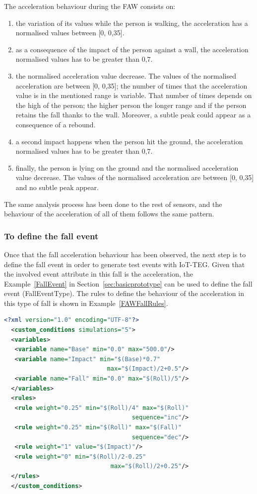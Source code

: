 \documentclass[conference]{IEEEtran}
\theoremstyle{definition}
\begin{document}
The acceleration behaviour during the FAW consists on:
\begin{enumerate}
 \item the variation of its values while the person is walking, the acceleration has a normalised values between [0, 0,35].
 \item as a consequence of the impact of the person against a wall, the acceleration normalised values has to be greater than 0,7.
 \item the normalised acceleration value decrease. The values of the normalised acceleration are between [0, 0,35]; the number of times that 
 the acceleration value is in the mentioned range is variable. That number of times depends on the high of the person; the higher person
 the longer range and if the person retains the fall thanks to the wall. Moreover, a subtle peak could appear as a consequence of a rebound.
 \item a second impact happens when the person hit the ground, the acceleration normalised values has to be greater than 0,7.
 \item finally, the person is lying on the ground and the normalised acceleration value decrease. The values of the normalised acceleration are 
 between [0, 0,35] and no subtle peak appear. 
\end{enumerate}

The same analysis process has been done to the rest of sensors, and the behaviour of the acceleration of all of them follows the same pattern.

\subsubsection*{To define the fall event} Once that the fall acceleration behaviour has been observed, the next step is to define the 
fall event in order to generate test events with IoT-TEG. Given that the involved event attribute in this fall is the acceleration, 
the Example~\ref{FallEvent} in Section~\ref{sec:basicprototype} can be used to define the fall event (FallEventType). The rules to
define the behaviour of the acceleration in this type of fall is shown in Example~\ref{FAWFallRules}.

\begin{lstlisting}[basicstyle=\ttfamily\footnotesize,language=XML,caption={Rules to define a FAW fall},label=FAWFallRules]
  <?xml version="1.0" encoding="UTF-8"?>
  <custom_conditions simulations="5">
  <variables>
   <variable name="Base" min="0.0" max="500.0"/>
   <variable name="Impact" min="$(Base)*0.7" 
                             max="$(Impact)/2+0.5"/>
   <variable name="Fall" min="0.0" max="$(Roll)/5"/>
  </variables>
  <rules>
   <rule weight="0.25" min="$(Roll)/4" max="$(Roll)" 
                                    sequence="inc"/>
   <rule weight="0.25" min="$(Roll)" max="$(Fall)" 
                                    sequence="dec"/>
   <rule weight="1" value="$(Impact)"/>
   <rule weight="0" min="$(Roll)/2-0.25" 
                              max="$(Roll)/2+0.25"/>
  </rules>
  </custom_conditions>
\end{lstlisting}
\end{document}
